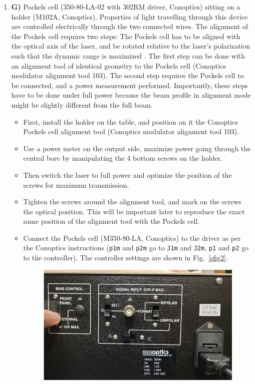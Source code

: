 \documentclass[10pt,letterpaper]{article}
\begin{document}
\begin{enumerate}[]
    \item \textbf{G)} Pockels cell (350-80-LA-02 with 302RM driver, Conoptics) sitting on a holder (M102A, Conoptics). Properties of light travelling through this device are controlled electrically through the two connected wires. The alignment of the Pockels cell requires two steps: The Pockels cell has to be aligned with the optical axis of the laser, and be rotated relative to the laser's polarization such that the dynamic range is maximized \cite{Conoptics2018, Scientifica2024}. The first step can be done with an alignment tool of identical geometry to the Pockels cell (Conoptics modulator alignment tool 103). The second step requires the Pockels cell to be connected, and a power measurement performed. Importantly, these steps have to be done under full power because the beam profile in alignment mode might be slightly different from the full beam.
    \begin{itemize}
        \item First, install the holder on the table, and position on it the Conoptics Pockels cell alignment tool (Conoptics modulator alignment tool 103).
        \item Use a power meter on the output side, maximize power going through the central bore by manipulating the 4 bottom screws on the holder.
        \item Then switch the laser to full power and optimize the position of the screws for maximum transmission.
        \item Tighten the screws around the alignment tool, and mark on the screws the optical position. This will be important later to reproduce the exact same position of the alignment tool with the Pockels cell.
        \item Connect the Pockels cell (M350-80-LA, Conoptics) to the driver as per the Conoptics instructions (\texttt{p1m} and \texttt{p2m} go to \texttt{J1m} and \texttt{J2m}, \texttt{p1} and \texttt{p2} go to the controller). The controller settings are shown in Fig.~\ref{sfig2}.
        \begin{figure}
            \includegraphics[width=.75\textwidth]{sfig2.jpg}

\end{figure}
\end{itemize}
\end{enumerate}
\end{document}

